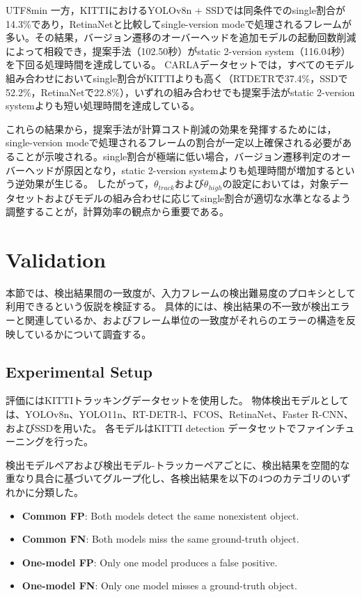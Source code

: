 \documentclass[conference, dvipdfmx]{IEEEtran}
\begin{document}
\begin{CJK}{UTF8}{min}
一方，KITTIにおけるYOLOv8n + SSDでは同条件でのsingle割合が14.3\%であり，RetinaNetと比較してsingle-version modeで処理されるフレームが多い。その結果，バージョン遷移のオーバーヘッドを追加モデルの起動回数削減によって相殺でき，提案手法（102.50秒）がstatic 2-version system（116.04秒）を下回る処理時間を達成している。
CARLAデータセットでは，すべてのモデル組み合わせにおいてsingle割合がKITTIよりも高く（RTDETRで37.4\%，SSDで52.2\%，RetinaNetで22.8\%），いずれの組み合わせでも提案手法がstatic 2-version systemよりも短い処理時間を達成している。

これらの結果から，提案手法が計算コスト削減の効果を発揮するためには，single-version modeで処理されるフレームの割合が一定以上確保される必要があることが示唆される。single割合が極端に低い場合，バージョン遷移判定のオーバーヘッドが原因となり，static 2-version systemよりも処理時間が増加するという逆効果が生じる。
したがって，$\theta_{track}$および$\theta_{high}$の設定においては，対象データセットおよびモデルの組み合わせに応じてsingle割合が適切な水準となるよう調整することが，計算効率の観点から重要である。

\section{Validation}
本節では、検出結果間の一致度が、入力フレームの検出難易度のプロキシとして利用できるという仮説を検証する。
具体的には、検出結果の不一致が検出エラーと関連しているか、およびフレーム単位の一致度がそれらのエラーの構造を反映しているかについて調査する。

\subsection{Experimental Setup}
評価にはKITTIトラッキングデータセットを使用した。
物体検出モデルとしては、YOLOv8n、YOLO11n、RT-DETR-l、FCOS、RetinaNet、Faster R-CNN、およびSSDを用いた。
各モデルはKITTI detection データセットでファインチューニングを行った。

検出モデルペアおよび検出モデル-トラッカーペアごとに、検出結果を空間的な重なり具合に基づいてグループ化し、各検出結果を以下の4つのカテゴリのいずれかに分類した。

\begin{itemize}
    \item \textbf{Common FP}: Both models detect the same nonexistent object.
    \item \textbf{Common FN}: Both models miss the same ground-truth object.
    \item \textbf{One-model FP}: Only one model produces a false positive.
    \item \textbf{One-model FN}: Only one model misses a ground-truth object.
\end{itemize}


\end{CJK}
\end{document}
